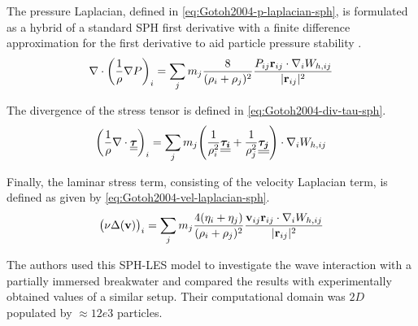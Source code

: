 The pressure Laplacian, defined in \ref{eq:Gotoh2004-p-laplacian-sph}, is formulated as a hybrid of a standard SPH first derivative with a finite difference approximation for the first derivative to aid particle pressure stability \parencite{cummins1999sph}.
\begin{equation}
	\nabla \cdot \bigg( \frac{1}{\rho} \nabla P \bigg)_i = \sum_j m_j \frac{8}{(\rho_i + \rho_j)^2} \frac{P_{ij} \mathbf{r}_{ij} \cdot \nabla_{i} W_{h, ij} }{|\mathbf{r}_{ij}|^{2}}
	\label{eq:Gotoh2004-p-laplacian-sph}
\end{equation}

The divergence of the stress tensor is defined in \ref{eq:Gotoh2004-div-tau-sph}.
\begin{equation}
	\bigg( \frac{1}{\rho} \nabla \cdot \underline{\underline{\bm{\tau}}} \bigg)_i = \sum_j m_j \Bigg( \frac{1}{\rho_i^2}\underline{\underline{\bm{\tau_i}}} + \frac{1}{\rho_j^2}\underline{\underline{\bm{\tau_j}}} \Bigg) \cdot \nabla_{i} W_{h, ij}
	\label{eq:Gotoh2004-div-tau-sph}
\end{equation}

Finally, the laminar stress term, consisting of the velocity Laplacian term, is defined as given by \ref{eq:Gotoh2004-vel-laplacian-sph}.
\begin{equation}
	\big(\nu \Delta(\mathbf{v}) \big)_i = \sum_j m_j \frac{4(\eta_i + \eta_j)}{(\rho_i + \rho_j)^2}\frac{\mathbf{v}_{ij} \mathbf{r}_{ij} \cdot \nabla_{i} W_{h, ij}}{|\mathbf{r}_{ij}|^{2}}
	\label{eq:Gotoh2004-vel-laplacian-sph}
\end{equation}

The authors used this SPH-LES model to investigate the wave interaction with a partially immersed breakwater and compared the results with experimentally obtained values of a similar setup. Their computational domain was $2D$ populated by $\approx 12e3$ particles.

